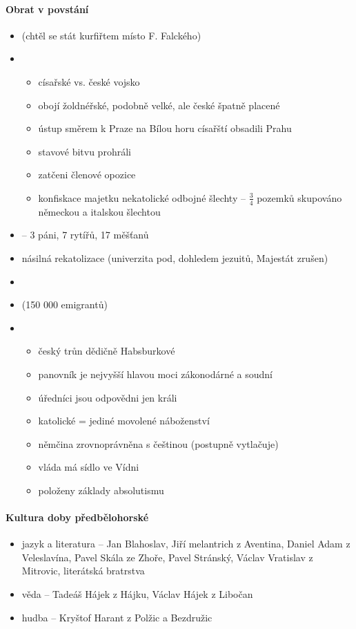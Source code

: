 \paragraph{Obrat v povstání}
\begin{itemize}
\item {} (chtěl se stát kurfiřtem místo F. Falckého)
\item {}
	\begin{itemize}
	\item císařské vs. české vojsko
	\item obojí žoldnéřské, podobně velké, ale české špatně placené
	\item ústup směrem k Praze na Bílou horu \ra císařští obsadili Prahu
	\item stavové bitvu prohráli
	\item zatčeni členové opozice
	\item konfiskace majetku nekatolické odbojné šlechty -- $\frac{3}{4}$ pozemků \ra skupováno německou a italskou šlechtou
	
	\end{itemize}
\item {} -- 3 páni, 7 rytířů, 17 měšťanů
\item násilná rekatolizace (univerzita pod, dohledem jezuitů, Majestát zrušen)

\item {}
\item {} (150 000 emigrantů)
\item {}
	\begin{itemize}
	\item český trůn dědičně Habsburkové
	\item panovník je nejvyšší hlavou moci zákonodárné a soudní
	\item úředníci jsou odpovědni jen králi
	\item katolické = jediné movolené náboženství
	\item němčina zrovnoprávněna s češtinou (postupně vytlačuje)
	\item vláda má sídlo ve Vídni
	\item položeny základy absolutismu
	\end{itemize}
\end{itemize}

\paragraph{Kultura doby předbělohorské}
\begin{itemize}
\item jazyk a literatura -- Jan Blahoslav, Jiří melantrich z Aventina, Daniel Adam z Veleslavína, Pavel Skála ze Zhoře, Pavel Stránský, Václav Vratislav z Mitrovic, literátská bratrstva
\item věda -- Tadeáš Hájek z Hájku, Václav Hájek z Libočan
\item hudba -- Kryštof Harant z Polžic a Bezdružic
\end{itemize}

